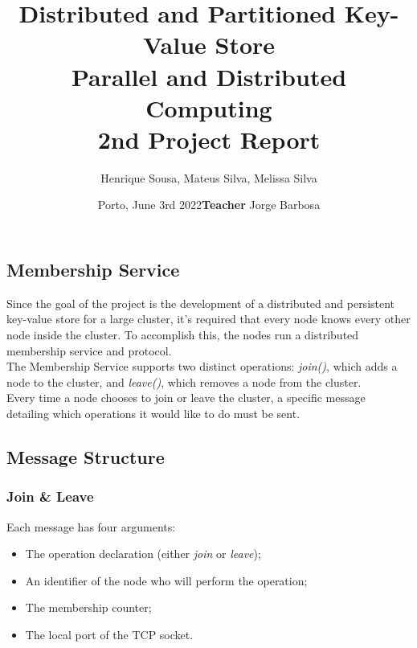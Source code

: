\documentclass{article}
\begin{document}
\title{Distributed and Partitioned Key-Value Store \\ \large{Parallel and Distributed Computing}
\\ \large{2nd Project Report}}



\author{Henrique Sousa, Mateus Silva, Melissa Silva}
\date{Porto, June 3rd 2022}
\date{\textbf{Teacher} Jorge Barbosa}

\maketitle

\begin{multicols}{2}

	\section{Membership Service}

	Since the goal of the project is the development of a distributed and persistent key-value store for a large cluster, it’s required that every node knows every other node inside the cluster. To accomplish this, the nodes run a distributed membership service and protocol. \\

	The Membership Service supports two distinct operations:
	\textit{join()}, which adds a node to the cluster, and \textit{leave()}, which removes a node from the cluster. \\
	
	Every time a node chooses to join or leave the cluster, a specific message detailing which operations it would like to do must be sent.

	\subsection{Message Structure}
	
	\subsubsection{Join \& Leave}
	Each message has four arguments:

	\begin{itemize}
		\item The operation declaration (either \textit{join} or \textit{leave});
		\item An identifier of the node who will perform the operation;
		\item The membership counter;
		\item The local port of the TCP socket.
	\end{itemize}
	

\end{multicols}
\end{document}
